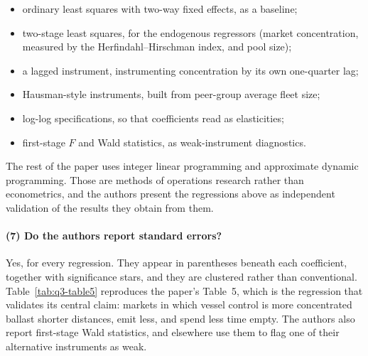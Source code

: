 \documentclass[11pt]{article}
\begin{document}
\begin{itemize}
\item ordinary least squares with two-way fixed effects, as a baseline;
\item two-stage least squares, for the endogenous regressors (market
concentration, measured by the Herfindahl--Hirschman index, and pool size);
\item a lagged instrument, instrumenting concentration by its own one-quarter
lag;
\item Hausman-style instruments, built from peer-group average fleet size;
\item log-log specifications, so that coefficients read as elasticities;
\item first-stage $F$ and Wald statistics, as weak-instrument diagnostics.
\end{itemize}

The rest of the paper uses integer linear programming and approximate dynamic
programming. Those are methods of operations research rather than
econometrics, and the authors present the regressions above as independent
validation of the results they obtain from them.

\paragraph{(7) Do the authors report standard errors?}
Yes, for every regression. They appear in parentheses beneath each coefficient,
together with significance stars, and they are clustered rather than
conventional. Table~\ref{tab:q3-table5} reproduces the paper's Table~5, which
is the regression that validates its central claim: markets in which vessel
control is more concentrated ballast shorter distances, emit less, and spend
less time empty. The authors also report first-stage Wald statistics, and
elsewhere use them to flag one of their alternative instruments as weak.
\end{document}
